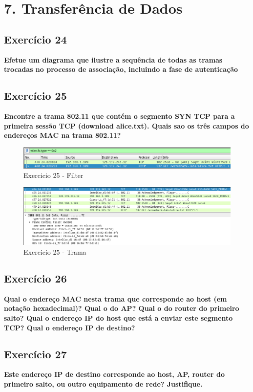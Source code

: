 \documentclass[a4paper]{report}
\begin{document}
\chapter{7. Transferência de Dados}
\section{Exercício 24}
\textbf{Efetue um diagrama que ilustre a sequência de todas as tramas trocadas
    no processo de associação, incluindo a fase de autenticação}

\section{Exercício 25}
\textbf{Encontre a trama 802.11 que contém o segmento SYN TCP para a primeira
    sessão TCP (download alice.txt). Quais sao os três campos do endereços MAC
    na trama 802.11?}
\begin{figure}[H]
    \centering 
    \includegraphics[width=\textwidth]{images/Ex25filtro.png}  
    \caption{Exercicio 25 - Filter}
    \label{fig:ex25filter}
\end{figure}

\begin{figure}[H]
    \centering 
    \includegraphics[width=\textwidth]{images/Ex25trama.png}  
    \caption{Exercicio 25 - Trama}
    \label{fig:ex25trama}
\end{figure}

\section{Exercício 26}
\textbf{Qual o endereço MAC nesta trama que corresponde ao host (em notação
    hexadecimal)? Qual o do AP? Qual o do router do primeiro salto? Qual o
    endereço IP do host que está a enviar este segmento TCP? Qual o endereço IP
    de destino?}

\section{Exercício 27}
\textbf{Este endereço IP de destino corresponde ao host, AP, router do primeiro
    salto, ou outro equipamento de rede? Justifique.}
\end{document}
